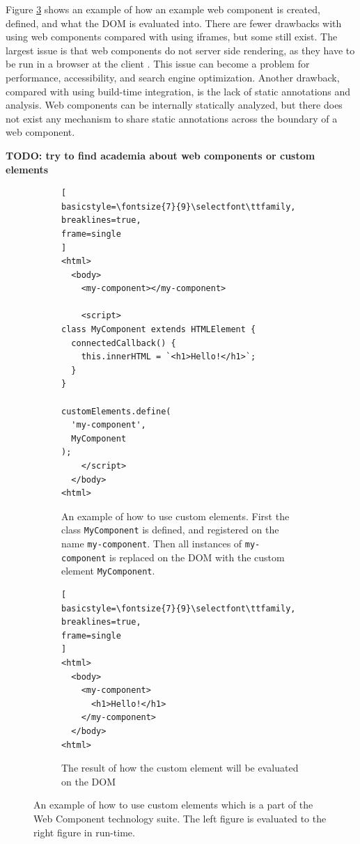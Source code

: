 Figure \ref{fig:web-components} shows an example of how an example web component is created, defined, and what the \ac{DOM} is evaluated into. There are fewer drawbacks with using web components compared with using iframes, but some still exist. The largest issue is that web components do not server side rendering, as they have to be run in a browser at the client \cite[ch.~5]{Geers2020}. This issue can become a problem for performance, accessibility, and search engine optimization. Another drawback, compared with using build-time integration, is the lack of static annotations and analysis. Web components can be internally statically analyzed, but there does not exist any mechanism to share static annotations across the boundary of a web component.

\textbf{TODO: try to find academia about web components or custom elements}

\begin{figure}
\centering
\begin{subfigure}{.65\linewidth}
  \centering
\begin{lstlisting}[
basicstyle=\fontsize{7}{9}\selectfont\ttfamily,
breaklines=true,
frame=single
]
<html>
  <body>
    <my-component></my-component>

    <script>
class MyComponent extends HTMLElement {
  connectedCallback() {
    this.innerHTML = `<h1>Hello!</h1>`;
  }
}

customElements.define(
  'my-component',
  MyComponent
);
    </script>
  </body>
<html>
\end{lstlisting}
  \caption{An example of how to use custom elements. First the class \texttt{MyComponent} is defined, and registered on the name \texttt{my-component}. Then all instances of \texttt{my-component} is replaced on the \ac{DOM} with the custom element \texttt{MyComponent}.}
  \label{fig:sub1}
\end{subfigure}
\hfill
\begin{subfigure}{.30\linewidth}
  \centering
\begin{lstlisting}[
basicstyle=\fontsize{7}{9}\selectfont\ttfamily,
breaklines=true,
frame=single
]
<html>
  <body>
    <my-component>
      <h1>Hello!</h1>
    </my-component>
  </body>
<html>
\end{lstlisting}
  \caption{The result of how the custom element will be evaluated on the \ac{DOM}}
  \label{fig:sub2}
\end{subfigure}
\caption{An example of how to use custom elements which is a part of the Web Component technology suite. The left figure is evaluated to the right figure in run-time.}
\label{fig:web-components}
\end{figure}

